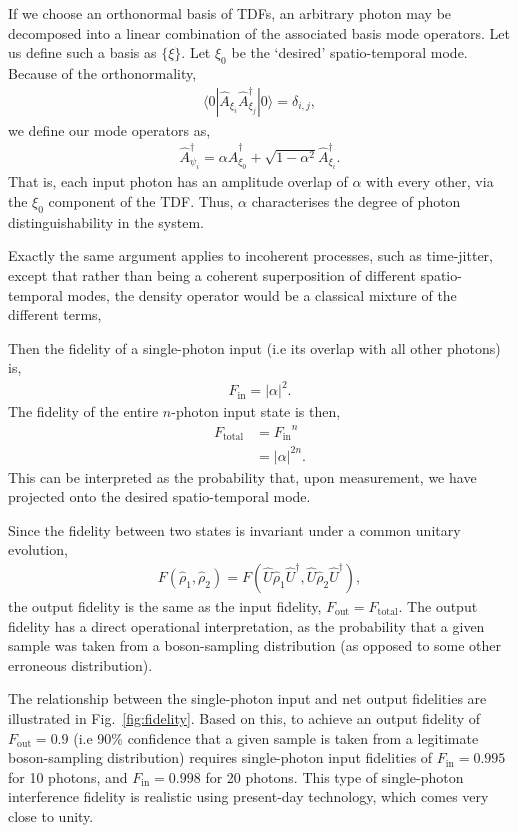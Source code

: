 \documentclass[aps,rmp,twocolumn,amsmath,amssymb,nofootinbib,superscriptaddress]{revtex4}
\newcommand{\bra}[1]{\langle#1|}
\newcommand{\ket}[1]{|#1\rangle}
\begin{document}
If we choose an orthonormal basis of TDFs, an arbitrary photon may be decomposed into a linear combination of the associated basis mode operators. Let us define such a basis as $\{\xi\}$. Let $\xi_0$ be the `desired' spatio-temporal mode. Because of the orthonormality,
\begin{align}
\bra{0} \hat{A}_{\xi_i} \hat{A}^\dag_{\xi_j} \ket{0} = \delta_{i,j},
\end{align}
we define our mode operators as,
\begin{align}
\hat{A}^\dag_{\psi_i} = \alpha \hat{A}^\dag_{\xi_0} + \sqrt{1-\alpha^2} \hat{A}^\dag_{\xi_i}.
\end{align}
That is, each input photon has an amplitude overlap of $\alpha$ with every other, via the $\xi_0$ component of the TDF. Thus, $\alpha$ characterises the degree of photon distinguishability in the system.

Exactly the same argument applies to incoherent processes, such as time-jitter, except that rather than being a coherent superposition of different spatio-temporal modes, the density operator would be a classical mixture of the different terms,

Then the fidelity of a single-photon input (i.e its overlap with all other photons) is,
\begin{align}
F_\mathrm{in} = |\alpha|^2.
\end{align}
The fidelity of the entire $n$-photon input state is then,
\begin{align}
F_\mathrm{total} &= {F_\mathrm{in}}^n \nonumber \\
&= |\alpha|^{2n}.
\end{align}
This can be interpreted as the probability that, upon measurement, we have projected onto the desired spatio-temporal mode.

Since the fidelity between two states is invariant under a common unitary evolution,
\begin{align}
F(\hat\rho_1,\hat\rho_2) = F(\hat{U}\hat\rho_1\hat{U}^\dag, \hat{U}\hat\rho_2\hat{U}^\dag),
\end{align}
the output fidelity is the same as the input fidelity, \mbox{$F_\mathrm{out} = F_\mathrm{total}$}. The output fidelity has a direct operational interpretation, as the probability that a given sample was taken from a boson-sampling distribution (as opposed to some other erroneous distribution).

The relationship between the single-photon input and net output fidelities are illustrated in Fig.~\ref{fig:fidelity}. Based on this, to achieve an output fidelity of \mbox{$F_\mathrm{out} = 0.9$} (i.e 90\% confidence that a given sample is taken from a legitimate boson-sampling distribution) requires single-photon input fidelities of \mbox{$F_\mathrm{in} = 0.995$} for 10 photons, and \mbox{$F_\mathrm{in} = 0.998$} for 20 photons. This type of single-photon interference fidelity is realistic using present-day technology, which comes very close to unity.
\end{document}

